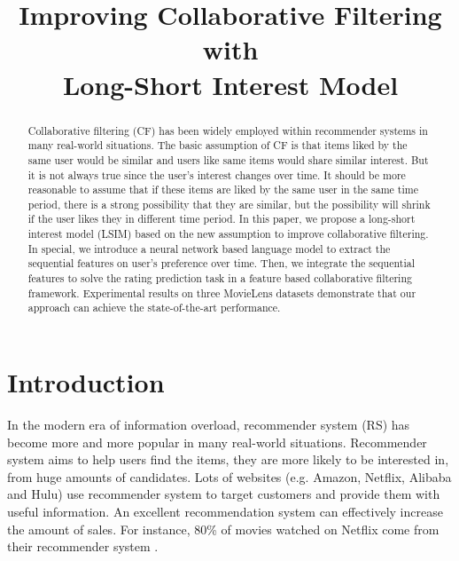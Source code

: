 \documentclass{sig-alternate-05-2015}
\begin{document}

\title{Improving Collaborative Filtering with\\
Long-Short Interest Model}


\maketitle

\begin{abstract}
Collaborative filtering (CF) has been widely employed within
recommender systems in many real-world situations.
The basic assumption of CF is that items liked by the same user would be similar and
users like same items would share similar interest.
But it is not always true since the user's interest changes over time.
It should be more reasonable to assume that
if these items are liked by the same user in the same time period,
there is a strong possibility that they are similar,
but the possibility will shrink if the user likes they in different time period.
In this paper, we propose a long-short interest model (LSIM) based on
the new assumption to improve collaborative filtering.
In special, we introduce a neural network based language model
to extract the sequential features on user's preference over time.
Then, we integrate the sequential features to solve the rating prediction task
in a feature based collaborative filtering framework.
Experimental results on three MovieLens datasets demonstrate that
our approach can achieve the state-of-the-art performance.
\end{abstract}


\section{Introduction}
In the modern era of information overload,
recommender system (RS) has become more and more popular in many real-world situations.
Recommender system aims to help users find the items,
they are more likely to be interested in,
from huge amounts of candidates.
Lots of websites (e.g. Amazon, Netflix, Alibaba and Hulu) use recommender system to
target customers and provide them with useful information.
An excellent recommendation system can effectively increase the amount of sales.
For instance, 80\% of movies watched on Netflix
come from their recommender system \cite{gomez2015netflix}.
\end{document}
